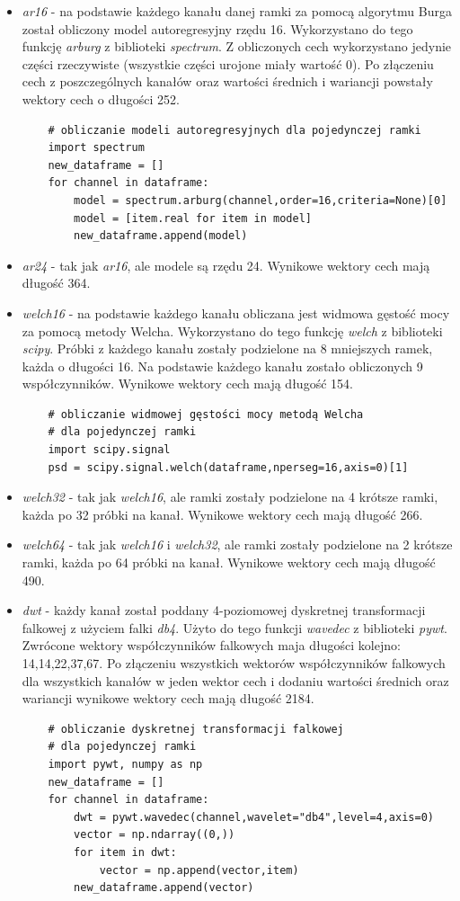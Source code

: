 \documentclass[notitlepage]{report}
\begin{document}
\begin{itemize}
	\item \textit{ar16} - na podstawie każdego kanału danej ramki za pomocą algorytmu Burga został obliczony model autoregresyjny rzędu 16. Wykorzystano do tego funkcję \textit{arburg} z biblioteki \textit{spectrum}. Z obliczonych cech wykorzystano jedynie części rzeczywiste (wszystkie części urojone miały wartość 0). Po złączeniu cech z poszczególnych kanałów oraz wartości średnich i wariancji powstały wektory cech o długości 252.
	\begin{lstlisting}
	# obliczanie modeli autoregresyjnych dla pojedynczej ramki
	import spectrum
	new_dataframe = []
	for channel in dataframe: 
		model = spectrum.arburg(channel,order=16,criteria=None)[0]
		model = [item.real for item in model]
		new_dataframe.append(model)
	\end{lstlisting}
	
	\item \textit{ar24} - tak jak \textit{ar16}, ale modele są rzędu 24. Wynikowe wektory cech mają długość 364.
	\item \textit{welch16} - na podstawie każdego kanału obliczana jest widmowa gęstość mocy za pomocą metody Welcha. Wykorzystano do tego funkcję \textit{welch} z biblioteki \textit{scipy}. Próbki z każdego kanału zostały podzielone na 8 mniejszych ramek, każda o długości 16. Na podstawie każdego kanału zostało obliczonych 9 współczynników. Wynikowe wektory cech mają długość 154.
	\begin{lstlisting}
	# obliczanie widmowej gęstości mocy metodą Welcha 
	# dla pojedynczej ramki
	import scipy.signal
	psd = scipy.signal.welch(dataframe,nperseg=16,axis=0)[1]
	\end{lstlisting}
	
	\item \textit{welch32} - tak jak \textit{welch16}, ale ramki zostały podzielone na 4 krótsze ramki, każda po 32 próbki na kanał. Wynikowe wektory cech mają długość 266.
	\item \textit{welch64} - tak jak \textit{welch16} i \textit{welch32}, ale ramki zostały podzielone na 2 krótsze ramki, każda po 64 próbki na kanał. Wynikowe wektory cech mają długość 490.
	\item \textit{dwt} - każdy kanał został poddany 4-poziomowej dyskretnej transformacji falkowej z użyciem falki \textit{db4}. Użyto do tego funkcji \textit{wavedec} z biblioteki \textit{pywt}. Zwrócone wektory współczynników falkowych maja długości kolejno: 14,14,22,37,67. Po złączeniu wszystkich wektorów współczynników falkowych dla wszystkich kanałów w jeden wektor cech i dodaniu wartości średnich oraz wariancji wynikowe wektory cech mają długość 2184.
	\begin{lstlisting}
	# obliczanie dyskretnej transformacji falkowej 
	# dla pojedynczej ramki
	import pywt, numpy as np
	new_dataframe = []
	for channel in dataframe:
		dwt = pywt.wavedec(channel,wavelet="db4",level=4,axis=0)
		vector = np.ndarray((0,))
		for item in dwt:
			vector = np.append(vector,item)
		new_dataframe.append(vector)
	\end{lstlisting}
	

\end{itemize}
\end{document}
